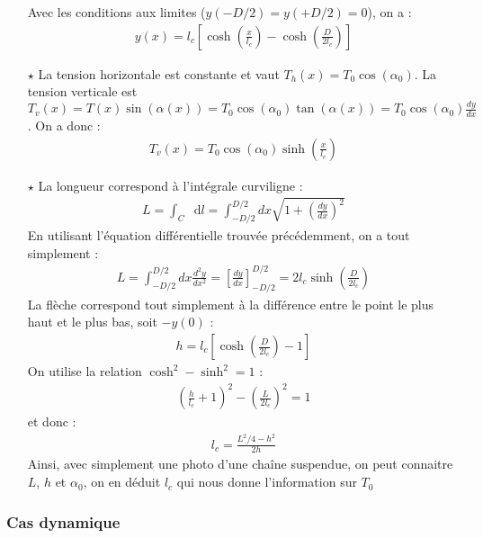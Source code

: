 \documentclass{report}
\newcommand*\dif{\mathop{}\!\mathrm{d}}
\begin{document}
\begin{itemize}
	Avec les conditions aux limites ($y(-D/2)=y(+D/2)=0$), on a :
	\begin{align*}
	y(x)=l_c\left[\cosh\left(\frac{x}{l_c} \right) -\cosh\left(\frac{D}{2l_c} \right) \right] 
	\end{align*}
	\item[$\star$] La tension horizontale est constante et vaut $T_h(x)=T_0\cos(\alpha_0)$. La tension verticale est $T_v(x)=T(x)\sin(\alpha(x))=T_0\cos(\alpha_0)\tan(\alpha(x))=T_0\cos(\alpha_0)\frac{dy}{dx}$. On a donc :
	\begin{align*}
		T_v(x)=T_0\cos(\alpha_0)\sinh\left(\frac{x}{l_c} \right) 
	\end{align*}
	
	\item[$\star$] La longueur correspond à l'intégrale curviligne :
	\begin{align*}
		L=\int_C \dif l=\int_{-D/2}^{D/2}dx\sqrt{1+\left( \frac{dy}{dx}\right)^2}
	\end{align*}
	En utilisant l'équation différentielle trouvée précédemment, on a tout simplement :
	\begin{align*}
		L=\int_{-D/2}^{D/2}dx\frac{d^2y}{dx^2}=\left[ \frac{dy}{dx}\right]_{-D/2}^{D/2}=2l_c\sinh\left(\frac{D}{2l_c} \right) 
	\end{align*}
	La flèche correspond tout simplement à la différence entre le point le plus haut et le plus bas, soit $-y(0)$ :
	\begin{align*}
		h=l_c\left[\cosh\left(\frac{D}{2l_c} \right) -1 \right] 
	\end{align*}
	On utilise la relation $\cosh^2-\sinh^2=1$ :
	\begin{align*}
		\left( \frac{h}{l_c}+1\right) ^2-\left( \frac{L}{2l_c}\right) ^2=1
	\end{align*}
	et donc :
	\begin{align*}
		l_c=\frac{L^2/4-h^2}{2h}
	\end{align*}
	Ainsi, avec simplement une photo d'une chaîne suspendue, on peut connaitre $L$, $h$ et $\alpha_0$, on en déduit $l_c$ qui nous donne l'information sur $T_0$
\end{itemize}

\subsubsection*{Cas dynamique}
\end{document}

